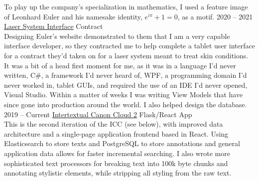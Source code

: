 \documentclass[9pt]{developercv} %
\begin{document}
\begin{entrylist}
{            To play up the company's specialization in mathematics, I used a
            feature image of Leonhard Euler and his namesake identity,
            $e^{i\pi}+1=0$, as a motif.
        }
    \entry
        {2020 -- 2021}
        {\href{https://euler-sci.com}{Laser System Interface}}
        {Contract}
        {
            \slashsep
            \slashsep
            \\
            Designing Euler's website demonstrated to them that I am a very
            capable interface developer, so they contracted me to help complete
            a tablet user interface for a contract they'd taken on for a laser
            system meant to treat skin conditions. It was a bit of a head first
            moment for me, as it was in a language I'd never written, C\#, a
            framework I'd never heard of, WPF, a programming domain I'd never
            worked in, tablet GUIs, and required the use of an IDE I'd never
            opened, Visual Studio. Within a matter of weeks I was writing View
            Models that have since gone into production around the world. I also
            helped design the database.
        }
    \entry
        {2019 -- Current}
        {{\href{https://github.com/Anno-Wiki}{Intertextual Canon Cloud 2}}}
        {Flask/React App}
        {
            \slashsep
            \slashsep
            \slashsep
            \slashsep
            \slashsep
            \slashsep
            \\
            This is the second iteration of the ICC (see below), with improved
            data architecture and a single-page application frontend based in
            React. Using Elasticsearch to store texts and PostgreSQL to store
            annotations and general application data allows for faster
            incremental searching. I also wrote more sophisticated text
            processors for breaking text into 100k byte chunks and annotating
            stylistic elements, while stripping all styling from the raw text.\\
}
\end{entrylist}
\end{document}

